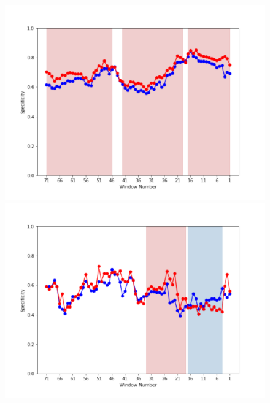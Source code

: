 \documentclass[submit]{ipsj}
\begin{document}
\begin{figure}[t]
\centering
\begin{minipage}[b]{0.65\columnwidth}
    \centering
    \includegraphics[width=1\columnwidth]{Uenaka_fig/RQ2_result/Nova/Nova_review_Specificity.pdf}
    \includegraphics[width=1\columnwidth]{Uenaka_fig/RQ2_result/Neutron/Neutron_review_Specificity.pdf}
\end{minipage}
\begin{minipage}[b]{0.65\columnwidth}
    \centering

\end{minipage}
\end{figure}
\end{document}
